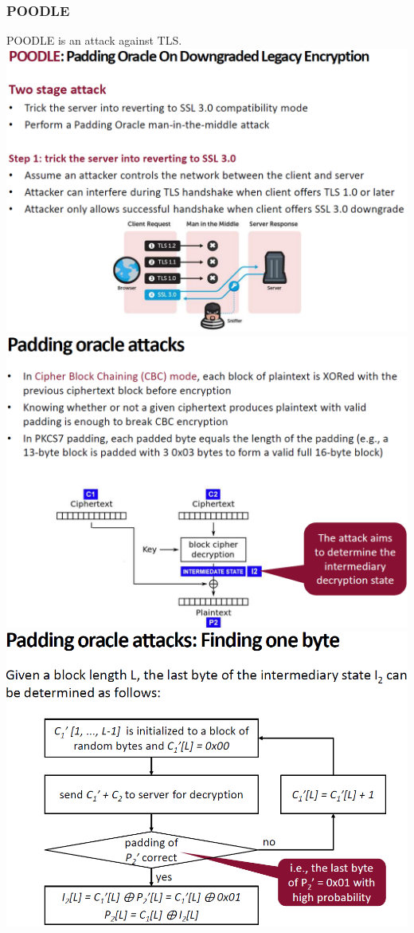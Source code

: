 \documentclass[12pt]{article}
\begin{document}
 \subsubsection{POODLE}
 POODLE is an attack against TLS.\\
 \includegraphics[width=\linewidth]{./slides/L7P3POODLE.PNG}\\
 \includegraphics[width=\linewidth]{./slides/L7P3PAD.PNG}\\
 \includegraphics[width=0.8\linewidth]{./slides/L7P3PADONE.PNG}\\
\end{document}
